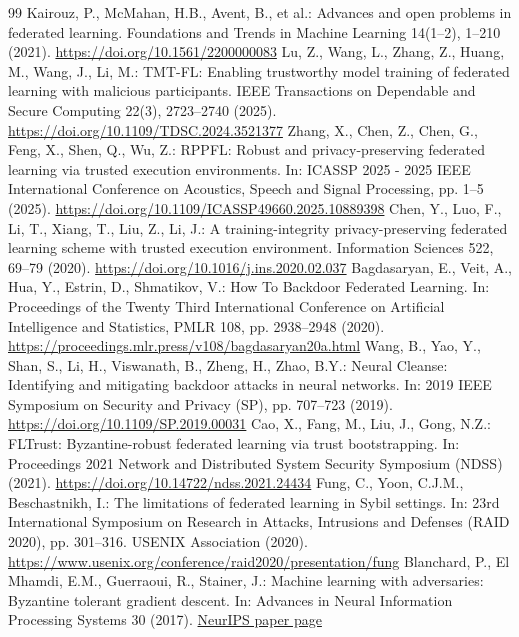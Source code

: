 \documentclass[runningheads,orivec]{llncs}
\begin{document}
\begin{thebibliography}{99}
     Kairouz, P., McMahan, H.B., Avent, B., et al.: Advances and open problems in federated learning. Foundations and Trends in Machine Learning 14(1--2), 1--210 (2021). \url{https://doi.org/10.1561/2200000083}
     Lu, Z., Wang, L., Zhang, Z., Huang, M., Wang, J., Li, M.: TMT-FL: Enabling trustworthy model training of federated learning with malicious participants. IEEE Transactions on Dependable and Secure Computing 22(3), 2723--2740 (2025). \url{https://doi.org/10.1109/TDSC.2024.3521377}
     Zhang, X., Chen, Z., Chen, G., Feng, X., Shen, Q., Wu, Z.: RPPFL: Robust and privacy-preserving federated learning via trusted execution environments. In: ICASSP 2025 - 2025 IEEE International Conference on Acoustics, Speech and Signal Processing, pp. 1--5 (2025). \url{https://doi.org/10.1109/ICASSP49660.2025.10889398}
     Chen, Y., Luo, F., Li, T., Xiang, T., Liu, Z., Li, J.: A training-integrity privacy-preserving federated learning scheme with trusted execution environment. Information Sciences 522, 69--79 (2020). \url{https://doi.org/10.1016/j.ins.2020.02.037}
     Bagdasaryan, E., Veit, A., Hua, Y., Estrin, D., Shmatikov, V.: How To Backdoor Federated Learning. In: Proceedings of the Twenty Third International Conference on Artificial Intelligence and Statistics, PMLR 108, pp. 2938--2948 (2020). \url{https://proceedings.mlr.press/v108/bagdasaryan20a.html}
     Wang, B., Yao, Y., Shan, S., Li, H., Viswanath, B., Zheng, H., Zhao, B.Y.: Neural Cleanse: Identifying and mitigating backdoor attacks in neural networks. In: 2019 IEEE Symposium on Security and Privacy (SP), pp. 707--723 (2019). \url{https://doi.org/10.1109/SP.2019.00031}
     Cao, X., Fang, M., Liu, J., Gong, N.Z.: FLTrust: Byzantine-robust federated learning via trust bootstrapping. In: Proceedings 2021 Network and Distributed System Security Symposium (NDSS) (2021). \url{https://doi.org/10.14722/ndss.2021.24434}
     Fung, C., Yoon, C.J.M., Beschastnikh, I.: The limitations of federated learning in Sybil settings. In: 23rd International Symposium on Research in Attacks, Intrusions and Defenses (RAID 2020), pp. 301--316. USENIX Association (2020). \url{https://www.usenix.org/conference/raid2020/presentation/fung}
     Blanchard, P., El Mhamdi, E.M., Guerraoui, R., Stainer, J.: Machine learning with adversaries: Byzantine tolerant gradient descent. In: Advances in Neural Information Processing Systems 30 (2017). \href{https://papers.nips.cc/paper/6617-machine-learning-with-adversaries-byzantine-tolerant-gradient-descent}{NeurIPS paper page}

\end{thebibliography}
\end{document}
